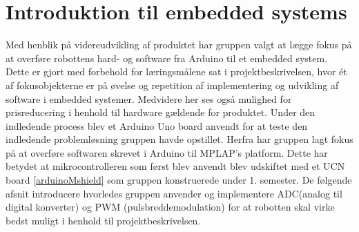 \section{Introduktion til embedded systems}
Med henblik på videreudvikling af produktet har gruppen valgt at lægge fokus på at overføre robottens hard- og software fra Arduino til et embedded system. Dette er gjort med forbehold for læringsmålene sat i projektbeskrivelsen, hvor ét af fokusobjekterne er på øvelse og repetition af implementering og udvikling af software i embedded systemer. 
\newline 
\newline 
Medvidere her ses også mulighed for prisreducering i henhold til hardware gældende for produktet. Under den indledende process blev et Arduino Uno board anvendt for at teste den indledende problemløsning gruppen havde opstillet. Herfra har gruppen lagt fokus på at overføre softwaren skrevet i Arduino til MPLAP's platform. Dette har betydet at mikrocontrolleren som først blev anvendt blev udskiftet med et UCN board \ref{arduinoMshield} som gruppen konstruerede under 1. semester. 
\newline
\newline
De følgende afsnit introducere hvorledes gruppen anvender og implementere ADC(analog til digital konverter) og PWM (pulsbreddemodulation) for at robotten skal virke bedst muligt i henhold til projektbeskrivelsen.  